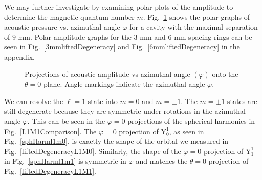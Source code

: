 \documentclass[12pt]{article}
\newcommand{\Ylm}[2]{\mathrm{Y}^{#1}_{#2}} %
\newcommand{\figref}[1]{Fig.\ \ref{#1}}
\begin{document}
	We may further investigate by examining polar plots of the amplitude to determine the magnetic quantum number $m$. \figref{9mmPolarliftedDegeneracy} shows the polar graphs of acoustic pressure vs. azimuthal angle $\varphi$ for a cavity with the maximal separation of $9$ mm. Polar amplitude graphs for the $3$ mm and $6$ mm spacing rings can be seen in \figref{3mmliftedDegeneracy} and \figref{6mmliftedDegeneracy} in the appendix.
	
	\begin{figure}[H]
		\centering
		\qquad
		\caption{Projections of acoustic amplitude vs azimuthal angle $(\varphi)$ onto the $\theta=0$ plane. Angle markings indicate the azimuthal angle $\varphi$.}
		\label{9mmPolarliftedDegeneracy}		
	\end{figure}

	We can resolve the $\ell=1$ state into $m=0$ and $m=\pm1$. The $m=\pm1$ states are still degenerate because they are symmetric under rotations in the azimuthal angle $\varphi$. This can be seen in the $\varphi=0$ projections of the spherical harmonics in \figref{L1M1Comparison}. The $\varphi=0$ projection of $\Ylm{1}{0}$, as seen in \figref{sphHarml1m0}, is exactly the shape of the orbital we measured in \figref{liftedDegeneracyL1M0}. Similarly, the shape of the $\varphi=0$ projection of $\Ylm{1}{1}$ in \figref{sphHarml1m1} is symmetric in $\varphi$ and matches the $\theta=0$ projection of \figref{liftedDegeneracyL1M1}.
\end{document}
